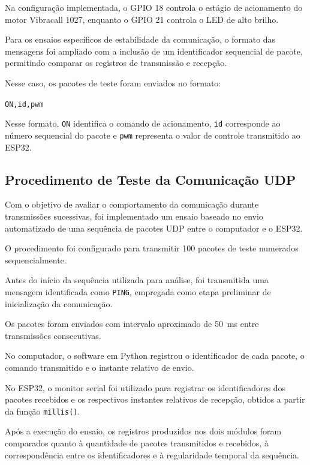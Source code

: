 Na configuração implementada, o GPIO 18 controla o estágio de acionamento do motor Vibracall 1027, enquanto o GPIO 21 controla o LED de alto brilho.

Para os ensaios específicos de estabilidade da comunicação, o formato das mensagens foi ampliado com a inclusão de um identificador sequencial de pacote, permitindo comparar os registros de transmissão e recepção.

Nesse caso, os pacotes de teste foram enviados no formato:

\begin{center}
\texttt{ON,id,pwm}
\end{center}

Nesse formato, \texttt{ON} identifica o comando de acionamento, \texttt{id} corresponde ao número sequencial do pacote e \texttt{pwm} representa o valor de controle transmitido ao ESP32.

\subsection{Procedimento de Teste da Comunicação UDP}
\label{sec:teste_estabilidade_udp}

Com o objetivo de avaliar o comportamento da comunicação durante transmissões sucessivas, foi implementado um ensaio baseado no envio automatizado de uma sequência de pacotes UDP entre o computador e o ESP32.

O procedimento foi configurado para transmitir 100 pacotes de teste numerados sequencialmente.

Antes do início da sequência utilizada para análise, foi transmitida uma mensagem identificada como \texttt{PING}, empregada como etapa preliminar de inicialização da comunicação.

Os pacotes foram enviados com intervalo aproximado de 50~ms entre transmissões consecutivas.

No computador, o software em Python registrou o identificador de cada pacote, o comando transmitido e o instante relativo de envio.

No ESP32, o monitor serial foi utilizado para registrar os identificadores dos pacotes recebidos e os respectivos instantes relativos de recepção, obtidos a partir da função \texttt{millis()}.

Após a execução do ensaio, os registros produzidos nos dois módulos foram comparados quanto à quantidade de pacotes transmitidos e recebidos, à correspondência entre os identificadores e à regularidade temporal da sequência.

